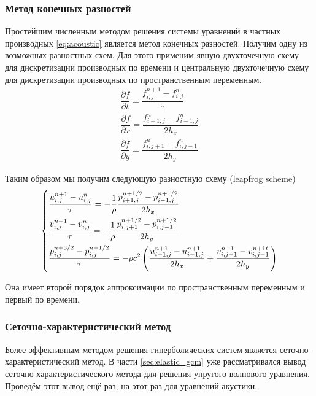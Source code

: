 \subsubsection{Метод конечных разностей}

Простейшим численным методом решения системы уравнений в частных производных \eqref{eq:acoustic} является метод конечных разностей. Получим одну из возможных разностных схем. Для этого применим явную двухточечную схему для дискретизации производных по времени и центральную двухточечную схему для дискретизации производных по пространственным переменным.
\begin{gather*}
    \dfrac{\partial f}{\partial t} = \dfrac{f^{n+1}_{i,j} - f^{n}_{i,j}}{\tau} \\
    \dfrac{\partial f}{\partial x} = \dfrac{f^{n}_{i+1,j} - f^{n}_{i-1,j}}{2 h_x} \\
    \dfrac{\partial f}{\partial y} = \dfrac{f^{n}_{i,j+1} - f^{n}_{i,j-1}}{2 h_y}
\end{gather*}

Таким образом мы получим следующую разностную схему (leapfrog scheme)
\begin{equation}
\begin{dcases}
	\frac{u^{n+1}_{i,j} - u^{n}_{i,j}}{\tau} = -\frac{1}{\rho}\frac{p^{n+1/2}_{i+1,j} - p^{n+1/2}_{i-1,j}}{2 h_x} \\
	\frac{v^{n+1}_{i,j} - v^{n}_{i,j}}{\tau} = -\frac{1}{\rho}\frac{p^{n+1/2}_{i,j+1} - p^{n+1/2}_{i,j-1}}{2 h_y} \\
    \dfrac{p^{n+3/2}_{i,j} - p^{n+1/2}_{i,j}}{\tau}= -\rho c^2 \left(\frac{u^{n+1}_{i+1,j} - u^{n+1}_{i-1,j}}{2 h_x} + \dfrac{v^{n+1}_{i,j+1} - v^{n+1t}_{i,j-1}}{2 h_y}\right) \\
\end{dcases}
\label{eq:diff}
\end{equation}

Она имеет второй порядок аппроксимации по пространственным переменным и первый по времени.

\subsubsection{Сеточно-характеристический метод}

Более эффективным методом решения гиперболических систем является сеточно-характеристический метод. В части  \ref{sec:elastic_gcm} уже рассматривался вывод сеточно-характеристического метода для решения упругого волнового уравнения. Проведём этот вывод ещё раз, на этот раз для уравнений акустики.

